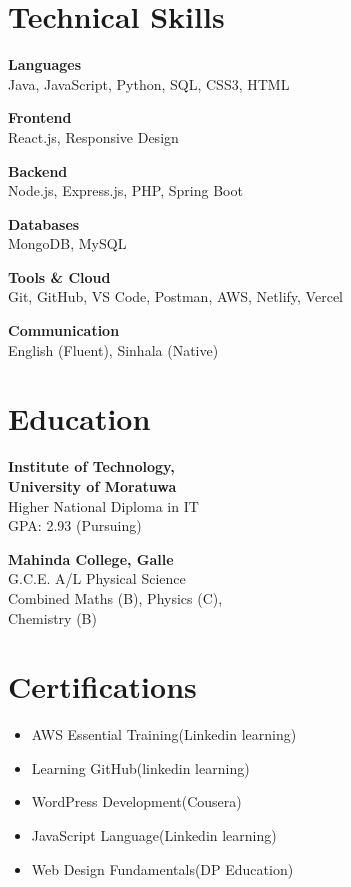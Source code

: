 \documentclass[letterpaper,11pt]{article}
\begin{document}
\setlength{\columnsep}{0.35in}
\begin{paracol}{2}

\section{Technical Skills}
\textbf{\normalsize Languages} \\
\normalsize Java, JavaScript, Python, SQL, CSS3, HTML

\vspace{5pt}
\textbf{\normalsize Frontend} \\
\normalsize React.js, Responsive Design

\vspace{5pt}
\textbf{\normalsize Backend} \\
\normalsize Node.js, Express.js, PHP, Spring Boot

\vspace{5pt}
\textbf{\normalsize Databases} \\
\normalsize MongoDB, MySQL

\vspace{5pt}
\textbf{\normalsize Tools \& Cloud} \\
\normalsize Git, GitHub, VS Code, Postman, AWS, Netlify, Vercel

\vspace{5pt}
\textbf{\normalsize Communication} \\
\normalsize English (Fluent), Sinhala (Native)

\section{Education}
\textbf{\normalsize Institute of Technology,} \\
\textbf{\normalsize University of Moratuwa} \\
\normalsize Higher National Diploma in IT \\
\normalsize GPA: 2.93 (Pursuing)

\vspace{7pt}
\textbf{\normalsize Mahinda College, Galle} \\
\normalsize G.C.E. A/L Physical Science \\
\normalsize Combined Maths (B), Physics (C), \\
Chemistry (B)

\section{Certifications}
\normalsize
\begin{itemize}[leftmargin=12pt, itemsep=1pt]
    \item AWS Essential Training(Linkedin learning)
    \item Learning GitHub(linkedin learning)
    \item WordPress Development(Cousera)
    \item JavaScript Language(Linkedin learning)
    \item Web Design Fundamentals(DP Education)
\end{itemize}


\end{paracol}
\end{document}
